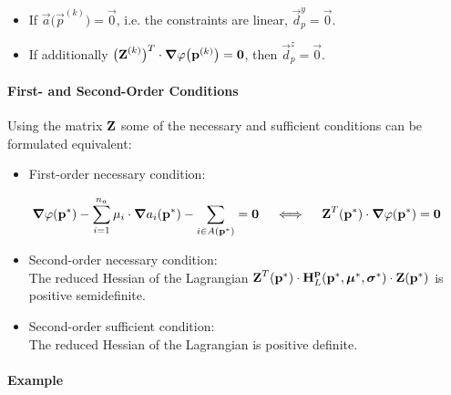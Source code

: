 					\begin{itemize}
						\item If \( \vec{a}\big(\vec{p}^{(k)}\big) = \vec{0} \), i.e. the constraints are linear, \( \vec{d}_p^y = \vec{0} \).
						\item If additionally \( \big(\boldsymbol{\mathrm{Z}}^{(k)}\big)^T \cdot \grad{\varphi}\big(\boldsymbol{\mathrm{p}}^{(k)}\big) = \boldsymbol{\mathrm{0}} \), then \( \vec{d}_p^z = \vec{0} \).
					\end{itemize}
				
				\paragraph{First- and Second-Order Conditions}
					Using the matrix \( \boldsymbol{\mathrm{Z}} \) some of the necessary and sufficient conditions can be formulated equivalent:
					\begin{itemize}
						\item First-order necessary condition:
					\end{itemize}
					\begin{align*}
						\grad{\varphi}(\boldsymbol{\mathrm{p}}^\ast) - \sum_{i = 1}^{n_a} \mu_i \cdot \grad{a_i}(\boldsymbol{\mathrm{p}}^\ast) - \sum_{i \in A(\boldsymbol{\mathrm{p}}^\ast)} = \boldsymbol{\mathrm{0}}
						\quad\iff\quad
						\boldsymbol{\mathrm{Z}}^T(\boldsymbol{\mathrm{p}}^\ast) \cdot \grad{\varphi}(\boldsymbol{\mathrm{p}}^\ast) = \boldsymbol{\mathrm{0}}
					\end{align*}
					\begin{itemize}
						\item Second-order necessary condition: \\ The reduced Hessian of the Lagrangian \( \boldsymbol{\mathrm{Z}}^T(\boldsymbol{\mathrm{p}}^\ast) \cdot \boldsymbol{\mathrm{H}}_L^{\boldsymbol{\mathrm{p}}}(\boldsymbol{\mathrm{p}}^\ast, \boldsymbol{\mathrm{\mu}}^\ast, \boldsymbol{\mathrm{\sigma}}^\ast) \cdot \boldsymbol{\mathrm{Z}}(\boldsymbol{\mathrm{p}}^\ast) \) is positive semidefinite.
						\item Second-order sufficient condition: \\ The reduced Hessian of the Lagrangian is positive definite.
					\end{itemize}

				\paragraph{Example} %

